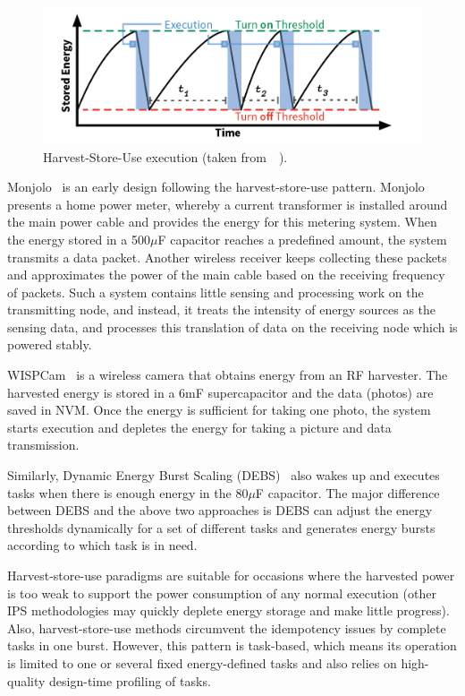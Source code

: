 \begin{figure}
    \centering
    \includegraphics[width=\columnwidth]{ch2_review/figures/saveanduse}
    \caption{Harvest-Store-Use execution (taken from~\cite{hester2017future}~).}
    \label{Figure:saveanduse}
\end{figure}

Monjolo~\cite{debruin2013monjolo} is an early design following the harvest-store-use pattern. 
Monjolo presents a home power meter, whereby a current transformer is installed around the main power cable and provides the energy for this metering system. 
When the energy stored in a 500$\mu$F capacitor reaches a predefined amount, the system transmits a data packet. Another wireless receiver keeps collecting these packets and approximates the power of the main cable based on the receiving frequency of packets. 
Such a system contains little sensing and processing work on the transmitting node, and instead, it treats the intensity of energy sources as the sensing data, and processes this translation of data on the receiving node which is powered stably.

WISPCam~\cite{naderiparizi2015wispcam} is a wireless camera that obtains energy from an RF harvester. 
The harvested energy is stored in a 6mF supercapacitor and the data (photos) are saved in NVM. 
Once the energy is sufficient for taking one photo, the system starts execution and depletes the energy for taking a picture and data transmission. 

Similarly, Dynamic Energy Burst Scaling (DEBS)~\cite{gomez2016dynamic} also wakes up and executes tasks when there is enough energy in the 80$\mu$F capacitor. 
The major difference between DEBS and the above two approaches is DEBS can adjust the energy thresholds dynamically for a set of different tasks and generates energy bursts according to which task is in need.

Harvest-store-use paradigms are suitable for occasions where the harvested power is too weak to support the power consumption of any normal execution (other IPS methodologies may quickly deplete energy storage and make little progress). 
Also, harvest-store-use methods circumvent the idempotency issues by complete tasks in one burst. 
However, this pattern is task-based, which means its operation is limited to one or several fixed energy-defined tasks and also relies on high-quality design-time profiling of tasks.

